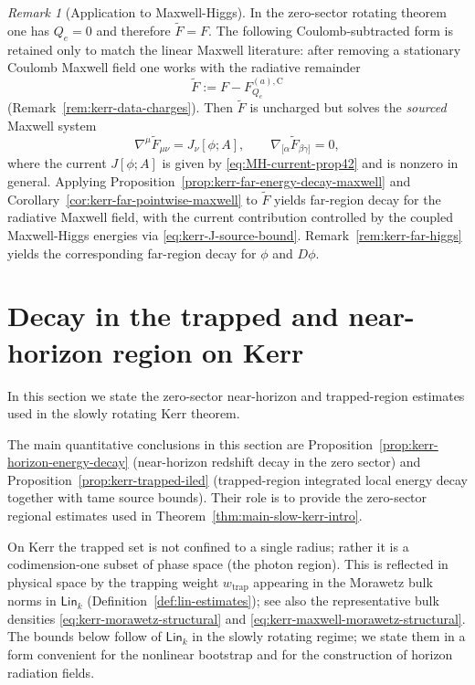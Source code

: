 \documentclass[11pt]{article}
\numberwithin{equation}{section}
\theoremstyle{plain}
\theoremstyle{definition}
\theoremstyle{remark}
\newtheorem{remark}{Remark}[section]
\newcommand{\Lin}{\mathsf{Lin}}
\begin{document}
\begin{remark}[Application to Maxwell-Higgs]\label{rem:kerr-far-mh}
In the zero-sector rotating theorem one has $Q_e=0$ and therefore $\widetilde F=F$.  The following Coulomb-subtracted form is retained only to match the linear Maxwell literature: after removing a stationary Coulomb Maxwell field one works with the radiative remainder
\begin{equation}
\widetilde F:=F-F^{(a),\mathrm C}_{Q_e}
\end{equation}
(Remark~\ref{rem:kerr-data-charges}).
Then $\widetilde F$ is uncharged but solves the \emph{sourced} Maxwell system
\begin{equation}
\nabla^{\mu}\widetilde F_{\mu\nu}=J_{\nu}[\phi;A],
\qquad
\nabla_{[\alpha}\widetilde F_{\beta\gamma]}=0,
\end{equation}
where the current $J[\phi;A]$ is given by \eqref{eq:MH-current-prop42} and is nonzero in general.
Applying Proposition~\ref{prop:kerr-far-energy-decay-maxwell} and Corollary~\ref{cor:kerr-far-pointwise-maxwell} to $\widetilde F$ yields far-region decay for the radiative Maxwell field, with the current contribution controlled by the coupled Maxwell-Higgs energies via \eqref{eq:kerr-J-source-bound}.
Remark~\ref{rem:kerr-far-higgs} yields the corresponding far-region decay for $\phi$ and $D\phi$.
\end{remark}




\section{Decay in the trapped and near-horizon region on Kerr}\label{sec:kerr-near-decay}

In this section we state the zero-sector near-horizon and trapped-region estimates used in the slowly rotating Kerr theorem.

The main quantitative conclusions in this section are Proposition~\ref*{prop:kerr-horizon-energy-decay} (near-horizon redshift decay in the zero sector) and Proposition~\ref{prop:kerr-trapped-iled} (trapped-region integrated local energy decay together with tame source bounds). Their role is to provide the zero-sector regional estimates used in Theorem~\ref{thm:main-slow-kerr-intro}.

On Kerr the trapped set is not confined to a single radius; rather it is a codimension-one subset of phase space (the photon region). This is reflected in physical space by the trapping weight $w_{\mathrm{trap}}$ appearing in the Morawetz bulk norms in $\Lin_{k}$ (Definition~\ref{def:lin-estimates}); see also the representative bulk densities \eqref{eq:kerr-morawetz-structural} and \eqref{eq:kerr-maxwell-morawetz-structural}. The bounds below follow of $\Lin_{k}$ in the slowly rotating regime; we state them in a form convenient for the nonlinear bootstrap and for the construction of horizon radiation fields.
\end{document}
